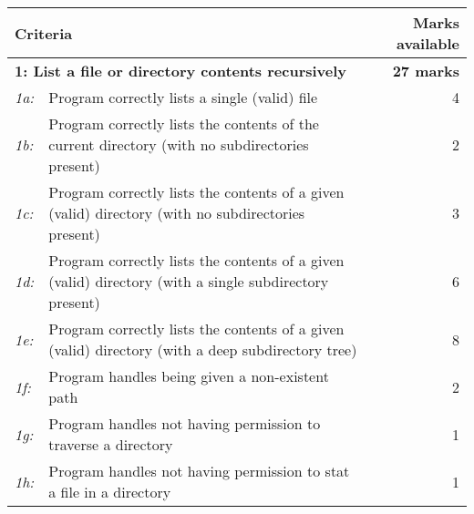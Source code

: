 \documentclass[12pt,a4paper]{article}
\begin{document}
\begin{longtable}{l p{12cm} r} \toprule

    \multicolumn{2}{l}{\textbf{Criteria}} & \textbf{Marks available} \\

    \midrule \multicolumn{2}{l}{\textbf{1: List a file or directory contents
    recursively}} & \textbf{27 marks} \\
    \textit{1a:} & Program correctly lists a single (valid) file & 4 \\
    \textit{1b:} & Program correctly lists the contents of the current directory (with no subdirectories present) & 2 \\
    \textit{1c:} & Program correctly lists the contents of a given (valid) directory (with no subdirectories present) & 3 \\
    \textit{1d:} & Program correctly lists the contents of a given (valid) directory (with a single subdirectory present) & 6 \\
    \textit{1e:} & Program correctly lists the contents of a given (valid) directory (with a deep subdirectory tree) & 8 \\
    \textit{1f:} & Program handles being given a non-existent path & 2 \\
    \textit{1g:} & Program handles not having permission to traverse a directory & 1 \\
    \textit{1h:} & Program handles not having permission to stat a file in a directory & 1 \\


\end{longtable}
\end{document}
